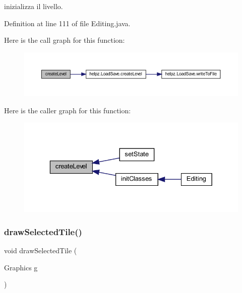 inizializza il livello. 



Definition at line 111 of file Editing.\+java.

Here is the call graph for this function\+:\nopagebreak
\begin{figure}[H]
\begin{center}
\leavevmode
\includegraphics[width=350pt]{classscenes_1_1_editing_ad79f312dd3a9e52f38a9e5f1536537fd_cgraph}
\end{center}
\end{figure}
Here is the caller graph for this function\+:\nopagebreak
\begin{figure}[H]
\begin{center}
\leavevmode
\includegraphics[width=329pt]{classscenes_1_1_editing_ad79f312dd3a9e52f38a9e5f1536537fd_icgraph}
\end{center}
\end{figure}
\mbox{\label{classscenes_1_1_editing_aa0f35d91a41dfb53af7bdd7d4a76916f}} 
\subsubsection{\texorpdfstring{draw\+Selected\+Tile()}{drawSelectedTile()}}
{\footnotesize\ttfamily void draw\+Selected\+Tile (\begin{DoxyParamCaption}\item[{Graphics}]{g }\end{DoxyParamCaption})}




